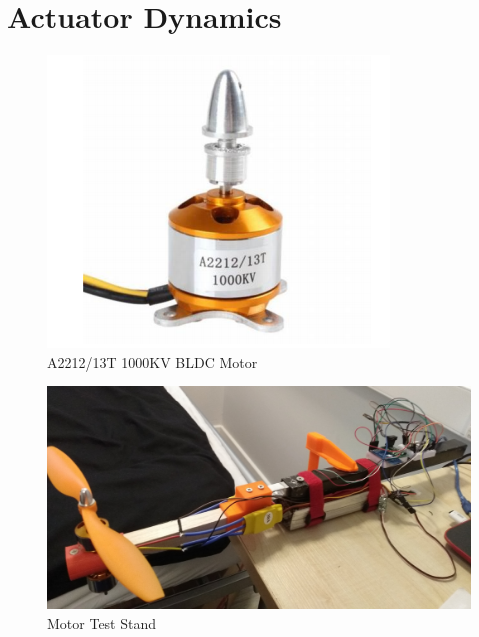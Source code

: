 \documentclass[12pt,a4paper,twoside]{report}
\begin{document}
		\section{Actuator Dynamics}
			
			\begin{figure}[h!]
				\centering
				\includegraphics[width=0.5\linewidth]{BLDC.png}
				\caption{A2212/13T 1000KV BLDC Motor}
				\label{fig:BLDC}
			\end{figure}
				
			\begin{figure}[h!]
				\centering
				\includegraphics[width=0.7\linewidth]{TestStand1.jpg}
				\caption{Motor Test Stand}
				\label{fig:motorteststand}
			\end{figure}
				
\end{document}

